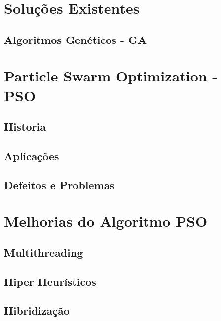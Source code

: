 \section{Soluções Existentes}
\lipsum[3]

\subsection{Algoritmos Genéticos - GA}
\lipsum[2]



\section{Particle Swarm Optimization - PSO}
\lipsum[4]

\subsection{Historia}
\lipsum[2]

\subsection{Aplicações}
\lipsum[3]

\subsection{Defeitos e Problemas}
\lipsum[2]

\section{Melhorias do Algoritmo PSO}
\lipsum[2]

\subsection{Multithreading}
\lipsum[2]

\subsection{Hiper Heurísticos}
\lipsum[2]

\subsection{Hibridização}
\lipsum[2]

